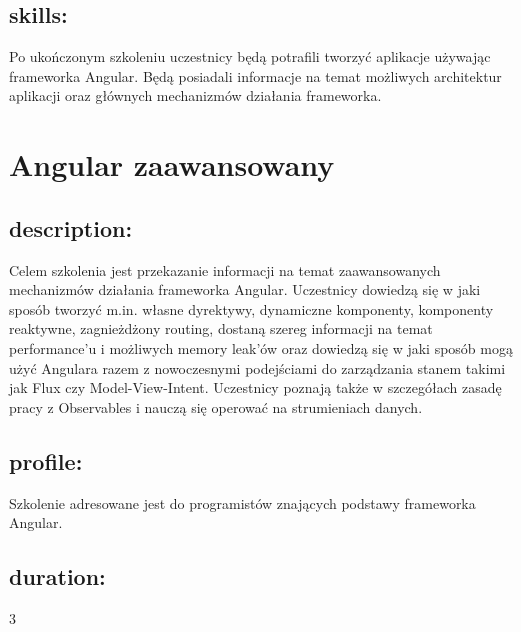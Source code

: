 \documentclass{article}[10pt]
\begin{document}
	\subsection*{skills:}
\begin{adjustwidth}{2cm}{}
	
Po ukończonym szkoleniu uczestnicy będą potrafili tworzyć aplikacje używając frameworka Angular. Będą posiadali informacje na temat możliwych architektur aplikacji oraz głównych mechanizmów działania frameworka. 

\end{adjustwidth}

\newpage


    
	\section{Angular zaawansowany}

	\subsection*{description:}
	\begin{adjustwidth}{2cm}{}
		
Celem szkolenia jest przekazanie informacji na temat zaawansowanych mechanizmów działania frameworka Angular. Uczestnicy dowiedzą się w jaki sposób tworzyć m.in. własne dyrektywy, dynamiczne komponenty, komponenty reaktywne, zagnieżdżony routing, dostaną szereg informacji na temat performance’u i możliwych memory leak’ów oraz dowiedzą się w jaki sposób mogą użyć Angulara razem z nowoczesnymi podejściami do zarządzania stanem takimi jak Flux czy Model-View-Intent.
Uczestnicy poznają także w szczegółach zasadę pracy z Observables i nauczą się operować na strumieniach danych.

	\end{adjustwidth}
	\subsection*{profile:}
\begin{adjustwidth}{2cm}{}
	
Szkolenie adresowane jest do programistów znających podstawy frameworka Angular.
\end{adjustwidth}
	\subsection*{duration:}
\begin{adjustwidth}{2cm}{}
	3
\end{adjustwidth}
\end{document}
